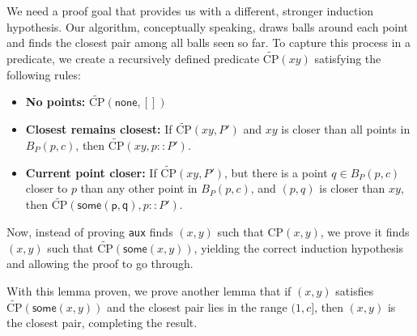 \documentclass{article}
\begin{document}
We need a proof goal that provides us with a different, stronger induction hypothesis.
Our algorithm, conceptually speaking, draws balls around each point and finds the closest pair among all balls seen so far.
To capture this process in a predicate, we create a recursively defined predicate $\widetilde{\text{CP}}(x\!y)$ satisfying the following rules:
\begin{itemize}
  \item \textbf{No points:} $\widetilde{\text{CP}}(\mathsf{none}, [])$
  \item \textbf{Closest remains closest:} If $\widetilde{\text{CP}}(x\!y, P')$ and $x\!y$ is closer than all points in $B_P(p, c)$, then $\widetilde{\text{CP}}(x\!y, p :: P')$.

  \label{case:curr_pt_closer}
  \item \textbf{Current point closer:} If $\widetilde{\text{CP}}(x\!y, P')$, but there is a point $q \in B_P(p, c)$ closer to $p$ than any other point in $B_P(p, c)$, and $(p, q)$ is closer than $x\!y$, then $\widetilde{\text{CP}}(\mathsf{some(p, q)}, p :: P')$.
\end{itemize}
Now, instead of proving \texttt{aux} finds $(x, y)$ such that $\text{CP}(x, y)$, we prove it finds $(x, y)$ such that $\widetilde{\text{CP}}(\mathsf{some}(x, y))$, yielding the correct induction hypothesis and allowing the proof to go through.

With this lemma proven, we prove another lemma that if $(x, y)$ satisfies $\widetilde{\text{CP}}(\mathsf{some}(x, y))$ and the closest pair lies in the range $(1, c]$, then $(x, y)$ is the closest pair, completing the result.



\end{document}
